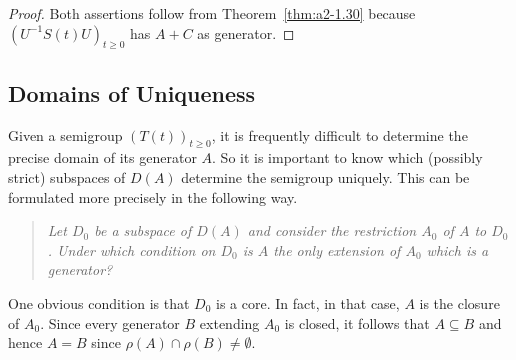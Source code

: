\begin{proof}
Both assertions follow from Theorem~\ref{thm:a2-1.30}  because $(U^{-1}S(t)U)_{t\geq 0}$ has $A+C$ as generator.
\end{proof}
\subsection{Domains of Uniqueness} \label{subsec:a2-1.se9}%
Given a semigroup $(T(t))_{t \geq 0}$,  
it is frequently difficult to determine the precise domain of its generator $A$.
So it is important to know which (possibly strict) subspaces of\/ $D(A)$ determine the semigroup uniquely.
This can be formulated more precisely in the following way.
\begin{quote}
\textit{Let $D_{0}$ be a subspace of\/ $D(A)$ and consider the restriction $A_{0}$ of\/ $A$ to $D_{0}$.
Under which condition on $D_{0}$ is $A$ the only extension of\/ $A_{0}$ which is a generator?}
\end{quote}
One obvious condition is that $D_{0}$ is a core.
In fact, in that case, $A$ is the closure of\/ $A_{0}$.
Since every generator $B$ extending $A_{0}$ is closed, it follows that $A \subseteq B$ and hence $A = B$ since 
$\rho(A) \cap \rho(B) \neq \emptyset$.

